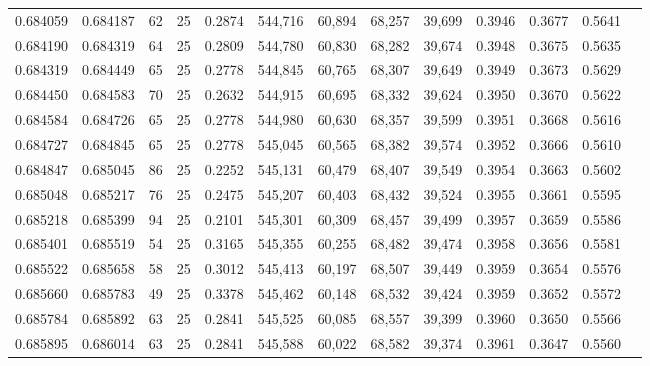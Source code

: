 \begin{tabular}{rrrrrrrrrrrrr}
0.684059 & 0.684187 &    62 &  25 &                                     0.2874 & 544,716 &  60,894 &  68,257 &  39,699 & 0.3946 & 0.3677 & 0.5641 \\
0.684190 & 0.684319 &    64 &  25 &                                     0.2809 & 544,780 &  60,830 &  68,282 &  39,674 & 0.3948 & 0.3675 & 0.5635 \\
0.684319 & 0.684449 &    65 &  25 &                                     0.2778 & 544,845 &  60,765 &  68,307 &  39,649 & 0.3949 & 0.3673 & 0.5629 \\
0.684450 & 0.684583 &    70 &  25 &                                     0.2632 & 544,915 &  60,695 &  68,332 &  39,624 & 0.3950 & 0.3670 & 0.5622 \\
0.684584 & 0.684726 &    65 &  25 &                                     0.2778 & 544,980 &  60,630 &  68,357 &  39,599 & 0.3951 & 0.3668 & 0.5616 \\
0.684727 & 0.684845 &    65 &  25 &                                     0.2778 & 545,045 &  60,565 &  68,382 &  39,574 & 0.3952 & 0.3666 & 0.5610 \\
0.684847 & 0.685045 &    86 &  25 &                                     0.2252 & 545,131 &  60,479 &  68,407 &  39,549 & 0.3954 & 0.3663 & 0.5602 \\
0.685048 & 0.685217 &    76 &  25 &                                     0.2475 & 545,207 &  60,403 &  68,432 &  39,524 & 0.3955 & 0.3661 & 0.5595 \\
0.685218 & 0.685399 &    94 &  25 &                                     0.2101 & 545,301 &  60,309 &  68,457 &  39,499 & 0.3957 & 0.3659 & 0.5586 \\
0.685401 & 0.685519 &    54 &  25 &                                     0.3165 & 545,355 &  60,255 &  68,482 &  39,474 & 0.3958 & 0.3656 & 0.5581 \\
0.685522 & 0.685658 &    58 &  25 &                                     0.3012 & 545,413 &  60,197 &  68,507 &  39,449 & 0.3959 & 0.3654 & 0.5576 \\
0.685660 & 0.685783 &    49 &  25 &                                     0.3378 & 545,462 &  60,148 &  68,532 &  39,424 & 0.3959 & 0.3652 & 0.5572 \\
0.685784 & 0.685892 &    63 &  25 &                                     0.2841 & 545,525 &  60,085 &  68,557 &  39,399 & 0.3960 & 0.3650 & 0.5566 \\
0.685895 & 0.686014 &    63 &  25 &                                     0.2841 & 545,588 &  60,022 &  68,582 &  39,374 & 0.3961 & 0.3647 & 0.5560 \\

\end{tabular}
